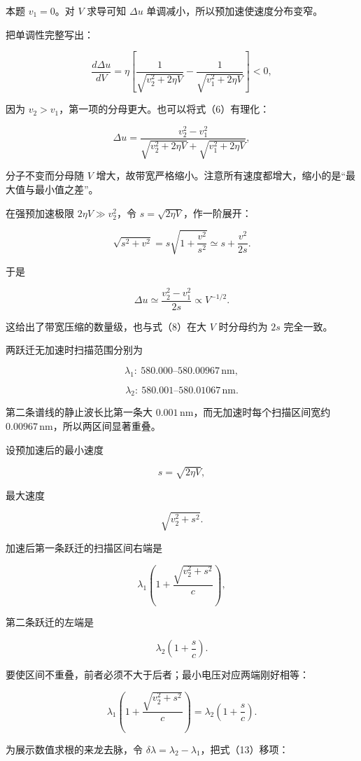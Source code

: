 \documentclass[12pt,a4paper,UTF8]{ctexart}
\begin{document}
本题 \(v_1=0\)。对 \(V\) 求导可知 \(\Delta u\)
单调减小，所以预加速使速度分布变窄。

把单调性完整写出：

\[
\frac{d\Delta u}{dV}
=\eta\left[
\frac1{\sqrt{v_2^2+2\eta V}}
-\frac1{\sqrt{v_1^2+2\eta V}}
\right]<0,
\tag{7}
\]

因为 \(v_2>v_1\)，第一项的分母更大。也可以将式（6）有理化：

\[
\Delta u
=\frac{v_2^2-v_1^2}
{\sqrt{v_2^2+2\eta V}+\sqrt{v_1^2+2\eta V}},
\tag{8}
\]

分子不变而分母随 \(V\)
增大，故带宽严格缩小。注意所有速度都增大，缩小的是``最大值与最小值之差''。

在强预加速极限 \(2\eta V\gg v_2^2\)，令
\(s=\sqrt{2\eta V}\)，作一阶展开：

\[
\sqrt{s^2+v^2}
=s\sqrt{1+\frac{v^2}{s^2}}
\simeq s+\frac{v^2}{2s}.
\]

于是

\[
\Delta u\simeq\frac{v_2^2-v_1^2}{2s}
\propto V^{-1/2}.
\]

这给出了带宽压缩的数量级，也与式（8）在大 \(V\) 时分母约为 \(2s\)
完全一致。

两跃迁无加速时扫描范围分别为

\[
\boxed{
\lambda_1:\ 580.000\text{--}580.00967\,\mathrm{nm}
},
\tag{9}
\]

\[
\boxed{
\lambda_2:\ 580.001\text{--}580.01067\,\mathrm{nm}
}.
\tag{10}
\]

第二条谱线的静止波长比第一条大
\(0.001\,\mathrm{nm}\)，而无加速时每个扫描区间宽约
\(0.00967\,\mathrm{nm}\)，所以两区间显著重叠。

设预加速后的最小速度

\[
s=\sqrt{2\eta V},
\tag{11}
\]

最大速度

\[
\sqrt{v_2^2+s^2}.
\tag{12}
\]

加速后第一条跃迁的扫描区间右端是

\[
\lambda_1\left(1+\frac{\sqrt{v_2^2+s^2}}c\right),
\]

第二条跃迁的左端是

\[
\lambda_2\left(1+\frac sc\right).
\]

要使区间不重叠，前者必须不大于后者；最小电压对应两端刚好相等：

\[
\lambda_1\left(1+\frac{\sqrt{v_2^2+s^2}}c\right)
=
\lambda_2\left(1+\frac sc\right).
\tag{13}
\]

为展示数值求根的来龙去脉，令
\(\delta\lambda=\lambda_2-\lambda_1\)，把式（13）移项：
\end{document}
